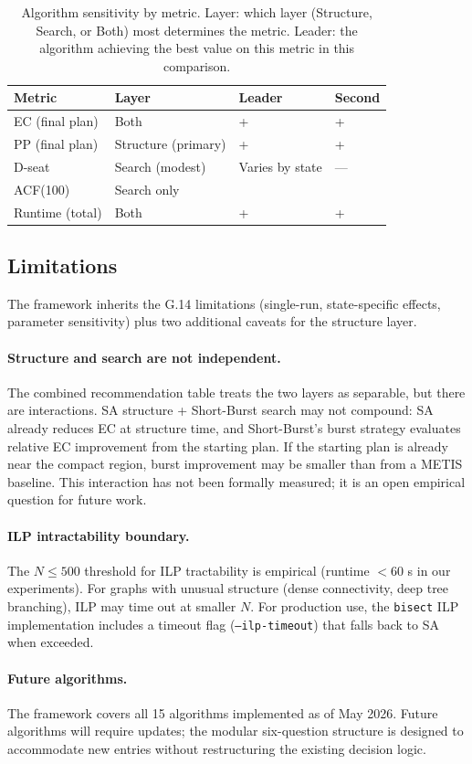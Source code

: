 \begin{table}[ht]
\centering
\caption{%
  Algorithm sensitivity by metric. Layer: which layer (Structure, Search, or Both)
  most determines the metric. Leader: the algorithm achieving the best
  value on this metric in this comparison.
}
\label{tab:sensitivity}
\begin{tabular}{@{}llll@{}}
\toprule
Metric & Layer & Leader & Second \\
\midrule
EC (final plan)   & Both & \pt{} + \sa{} & \sburst{} + \sa{} \\
PP (final plan)   & Structure (primary) & \cvdgeo{} + \smcp{} & \cvdgeo{} + \smc{} \\
D-seat            & Search (modest)     & Varies by state & --- \\
ACF(100)          & Search only         & \ams{} & \pt{} \\
Runtime (total)   & Both & \bfsgrow{} + \flip{} & \metis{} + \flip{} \\
\bottomrule
\end{tabular}
\end{table}

\subsection{Limitations}

The framework inherits the G.14 limitations (single-run, state-specific effects,
parameter sensitivity) plus two additional caveats for the structure layer.

\paragraph{Structure and search are not independent.}
The combined recommendation table treats the two layers as separable, but there
are interactions.
SA structure + Short-Burst search may not compound: SA already reduces EC at
structure time, and Short-Burst's burst strategy evaluates relative EC
improvement from the starting plan.
If the starting plan is already near the compact region, burst improvement
may be smaller than from a METIS baseline.
This interaction has not been formally measured; it is an open empirical
question for future work.

\paragraph{ILP intractability boundary.}
The $N \leq 500$ threshold for ILP tractability is empirical (runtime
$< 60$ s in our experiments).
For graphs with unusual structure (dense connectivity, deep tree branching),
ILP may time out at smaller $N$.
For production use, the \texttt{bisect} ILP implementation includes a timeout
flag (\texttt{--ilp-timeout}) that falls back to SA when exceeded.

\paragraph{Future algorithms.}
The framework covers all 15 algorithms implemented as of May 2026.
Future algorithms will require updates; the modular six-question structure
is designed to accommodate new entries without restructuring the existing
decision logic.
